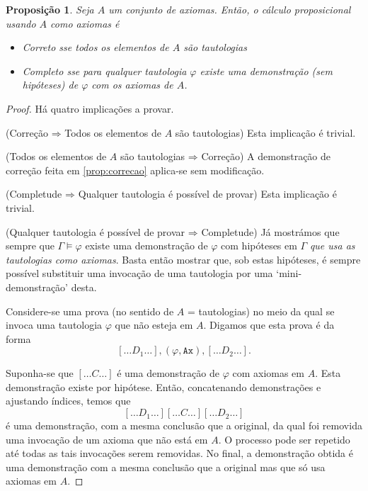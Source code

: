 \documentclass{report}
\newtheorem{prop}{Proposição}
\theoremstyle{definition}
\theoremstyle{remark}
\newcommand{\imply}{\mathbin{\Rightarrow}}
\begin{document}
	\begin{prop}\label{axiomconditions}
	Seja $A$ um conjunto de axiomas. Então, o cálculo proposicional usando $A$ como axiomas é
	
	\begin{itemize}
	\item Correto sse todos os elementos de $A$ são tautologias
	
	\item Completo sse para qualquer tautologia $\varphi$ existe uma demonstração (sem hipóteses) de $\varphi$ com os axiomas de $A$.
	\end{itemize} 
	\end{prop}
	
	\begin{proof}
	Há quatro implicações a provar.
	
	(Correção $\imply$ Todos os elementos de $A$ são tautologias) Esta implicação é trivial.
	
	(Todos os elementos de $A$ são tautologias $\imply$ Correção) A demonstração de correção feita em \ref{prop:correcao} aplica-se sem modificação.
	
	(Completude $\imply$ Qualquer tautologia é possível de provar) Esta implicação é trivial.
	
	(Qualquer tautologia é possível de provar $\imply$ Completude) Já mostrámos que sempre que $\Gamma \vDash \varphi$ existe uma demonstração de $\varphi$ com hipóteses em $\Gamma$ \emph{que usa as tautologias como axiomas}. Basta então mostrar que, sob estas hipóteses, é sempre possível substituir uma invocação de uma tautologia por uma `mini-demonstração' desta.
	
	Considere-se uma prova (no sentido de $A$ = tautologias) no meio da qual se invoca uma tautologia $\varphi$ que não esteja em $A$. Digamos que esta prova é da forma
	\[ [\dots D_1 \dots], (\varphi, \texttt{Ax}), [\dots D_2 \dots].\]
	
	Suponha-se que $[\dots C \dots]$ é uma demonstração de $\varphi$ com axiomas em $A$. Esta demonstração existe por hipótese. Então, concatenando demonstrações e ajustando índices, temos que
	\[ [\dots D_1 \dots] [\dots C \dots] [\dots D_2 \dots] \]
	é uma demonstração, com a mesma conclusão que a original, da qual foi removida uma invocação de um axioma que não está em $A$. O processo pode ser repetido até todas as tais invocações serem removidas. No final, a demonstração obtida é uma demonstração com a mesma conclusão que a original mas que só usa axiomas em $A$.
	\end{proof}
	
\end{document}
